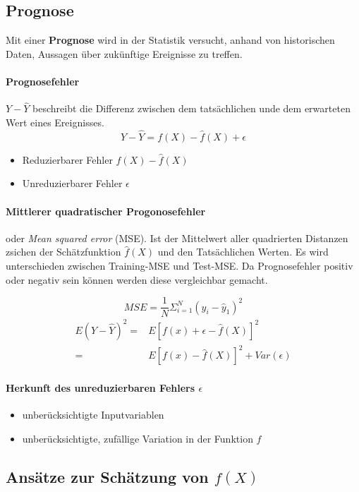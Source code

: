 \documentclass[a3paper, 8pt]{extarticle}
\begin{document}
\begin{multicols*}{5}
\subsection{Prognose}
Mit einer \textbf{Prognose} wird in der Statistik versucht, anhand von historischen Daten, Aussagen über zukünftige Ereignisse zu treffen.

\paragraph{Prognosefehler} $Y - \hat{Y}$ beschreibt die Differenz zwischen dem tatsächlichen unde dem erwarteten Wert eines Ereignisses.
$$Y - \hat{Y} = f(X)- \hat{f}(X) + \epsilon$$
\begin{itemize}
    \item Reduzierbarer Fehler $f(X)-\hat{f}(X)$
    \item Unreduzierbarer Fehler $\epsilon$
\end{itemize}
   
\paragraph{Mittlerer quadratischer Progonosefehler} oder \textit{Mean squared error} (MSE). Ist der Mittelwert aller quadrierten Distanzen zsichen der Schätzfunktion $\hat{f}(X)$ und den Tatsächlichen Werten. Es wird unterschieden zwischen Training-MSE und Test-MSE. Da Prognosefehler positiv oder negativ sein können werden diese vergleichbar gemacht.

\[MSE=\frac{1}{N}\Sigma_{i=1}^N(y_i-\hat{y}_1)^2\]
\begin{align*}
    E(Y-\hat{Y})^2 =& E[f(x)+\epsilon-\hat{f}(X)]^2\\
=& E[f(x)-\hat{f}(X)]^2 + Var(\epsilon)
\end{align*}

\paragraph{Herkunft des unreduzierbaren Fehlers $\epsilon$}\begin{itemize}
    \item unberücksichtigte Inputvariablen
    \item unberücksichtigte, zufällige Variation in der Funktion $f$
\end{itemize}



\subsection{Ansätze zur Schätzung von $f(X)$}


\end{multicols*}
\end{document}
